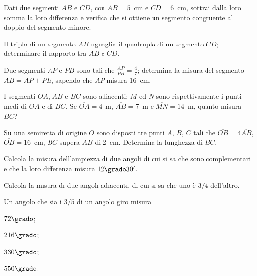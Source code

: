 \begin{multicols}{2}
\begin{esercizio}
\label{ese:1.105}
Dati due segmenti $AB$ e $CD$, con $\overline{AB} = 5$~cm e 
$\overline{CD} = 6$~cm, sottrai dalla loro somma la loro differenza e 
verifica che si ottiene un segmento congruente al doppio del segmento 
minore.
\end{esercizio}

\begin{esercizio}
\label{ese:1.106}
Il triplo di un segmento $AB$ uguaglia il quadruplo di un segmento 
$CD$; determinare il rapporto tra $AB$ e $CD$.
\end{esercizio}

\begin{esercizio}
\label{ese:1.107}
Due segmenti $AP$ e $PB$ sono tali che $\frac{AP}{PB}=\frac{4}{7}$; 
determina la misura del segmento $AB=AP+PB$, sapendo che $AP$ misura 
16~cm.
\end{esercizio}

\begin{esercizio}
\label{ese:1.108}
I segmenti $OA$, $AB$ e $BC$ sono adiacenti; $M$ ed $N$ sono 
rispettivamente i punti medi di $OA$ e di $BC$. Se 
$\overline{OA}=4$~m, $\overline{AB}=7$~m e $\overline{MN}=14$~m, 
quanto misura $BC$?
\end{esercizio}

\begin{esercizio}
\label{ese:1.109}
Su una semiretta di origine $O$ sono disposti tre punti $A$, $B$, $C$ 
tali che $\overline{OB}=4\overline{AB}$, $\overline{OB}=16$~cm, $BC$ 
supera $AB$ di 2~cm. Determina la lunghezza di $BC$.
\end{esercizio}

\begin{esercizio}
\label{ese:1.110}
Calcola la misura dell'ampiezza di due angoli di cui si sa che sono 
complementari e che la loro differenza misura $12\grado30'$.
\end{esercizio}
 
\begin{esercizio}
\label{ese:1.111}
Calcola la misura di due angoli adiacenti, di cui si sa che uno è 
$3/4$ dell'altro.
\end{esercizio}

\begin{esercizio}
\label{ese:1.112}
Un angolo che sia i $3/5$ di un angolo giro misura
\begin{multicols}{2}
\begin{enumeratea}
\item $72\grado$;	\item $216\grado$;	\item 
$330\grado$;	\item $550\grado$.
\end{enumeratea}
\end{multicols}
\end{esercizio}


\end{multicols}
